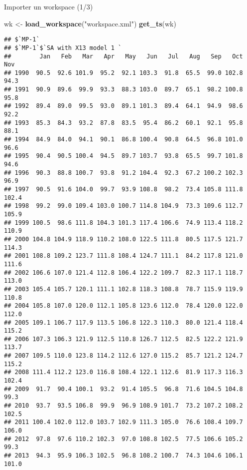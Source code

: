 \documentclass[10pt,xcolor=table,color={dvipsnames,usenames},ignorenonframetext,usepdftitle=false,french]{beamer}
\newenvironment{Shaded}{\begin{snugshade}}{\end{snugshade}}
\newcommand{\KeywordTok}[1]{\textcolor[rgb]{0.13,0.29,0.53}{\textbf{#1}}}
\newcommand{\NormalTok}[1]{#1}
\newcommand{\StringTok}[1]{\textcolor[rgb]{0.31,0.60,0.02}{#1}}
\begin{document}
\begin{frame}[fragile]{Importer un workspace (1/3)}
\protect\hypertarget{importer-un-workspace-13}{}

\footnotesize

\begin{Shaded}
\begin{Highlighting}[]
\NormalTok{wk <-}\StringTok{ }\KeywordTok{load_workspace}\NormalTok{(}\StringTok{"workspace.xml"}\NormalTok{)}
\KeywordTok{get_ts}\NormalTok{(wk)}
\end{Highlighting}
\end{Shaded}

\begin{verbatim}
## $`MP-1`
## $`MP-1`$`SA with X13 model 1 `
##        Jan   Feb   Mar   Apr   May   Jun   Jul   Aug   Sep   Oct   Nov
## 1990  90.5  92.6 101.9  95.2  92.1 103.3  91.8  65.5  99.0 102.8  94.3
## 1991  90.9  89.6  99.9  93.3  88.3 103.0  89.7  65.1  98.2 100.8  95.8
## 1992  89.4  89.0  99.5  93.0  89.1 101.3  89.4  64.1  94.9  98.6  92.2
## 1993  85.3  84.3  93.2  87.8  83.5  95.4  86.2  60.1  92.1  95.8  88.1
## 1994  84.9  84.0  94.1  90.1  86.8 100.4  90.8  64.5  96.8 101.0  96.6
## 1995  90.4  90.5 100.4  94.5  89.7 103.7  93.8  65.5  99.7 101.8  94.6
## 1996  90.3  88.8 100.7  93.8  91.2 104.4  92.3  67.2 100.2 102.3  96.9
## 1997  90.5  91.6 104.0  99.7  93.9 108.8  98.2  73.4 105.8 111.8 102.4
## 1998  99.2  99.0 109.4 103.0 100.7 114.8 104.9  73.3 109.6 112.7 105.9
## 1999 100.5  98.6 111.8 104.3 101.3 117.4 106.6  74.9 113.4 118.2 110.9
## 2000 104.8 104.9 118.9 110.2 108.0 122.5 111.8  80.5 117.5 121.7 114.3
## 2001 108.8 109.2 123.7 111.8 108.4 124.7 111.1  84.2 117.8 121.0 111.6
## 2002 106.6 107.0 121.4 112.8 106.4 122.2 109.7  82.3 117.1 118.7 113.0
## 2003 105.4 105.7 120.1 111.1 102.8 118.3 108.8  78.7 115.9 119.9 110.8
## 2004 105.8 107.0 120.0 112.1 105.8 123.6 112.0  78.4 120.0 122.0 112.0
## 2005 109.1 106.7 117.9 113.5 106.8 122.3 110.3  80.0 121.4 118.4 115.2
## 2006 107.3 106.3 121.9 112.5 110.8 126.7 112.5  82.5 122.2 121.9 113.7
## 2007 109.5 110.0 123.8 114.2 112.6 127.0 115.2  85.7 121.2 124.7 115.2
## 2008 111.4 112.2 123.0 116.8 108.4 122.1 112.6  81.9 117.3 116.3 102.4
## 2009  91.7  90.4 100.1  93.2  91.4 105.5  96.8  71.6 104.5 104.8  99.3
## 2010  93.7  93.5 106.8  99.9  96.9 108.9 101.7  73.2 107.2 108.2 102.5
## 2011 100.4 102.0 112.0 103.7 102.9 111.3 105.0  76.6 108.4 109.7 106.0
## 2012  97.8  97.6 110.2 102.3  97.0 108.8 102.5  77.5 106.6 105.2  99.3
## 2013  94.3  95.9 106.3 102.5  96.8 108.2 100.7  74.3 104.6 106.1 101.0

\end{verbatim}
\end{frame}
\end{document}

